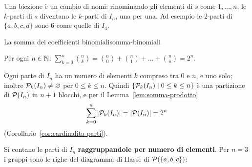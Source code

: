 \begin{spiegazione}
    Una biezione è un cambio di nomi: rinominando gli elementi di $s$ come $1, \dots, n$, le $k$-parti di $s$ diventano le $k$-parti di
    $I_n$, una per una. Ad esempio le $2$-parti di $\{a, b, c, d\}$ sono $6$ come quelle di $I_4$.
\end{spiegazione}

\begin{concetto}
\begin{Teorema}{La somma dei coefficienti binomiali}{somma-binomiali}
    \begin{prerequisiti}
    \end{prerequisiti}
    Per ogni $n \in \mathbb{N}$: \quad $\displaystyle\sum_{k = 0}^{n} \binom{n}{k} = \binom{n}{0} + \binom{n}{1} + \dots + \binom{n}{n} = 2^n$.
\end{Teorema}
\begin{dimostrazione}
    Ogni parte di $I_n$ ha un numero di elementi $k$ compreso tra $0$ e $n$, e uno solo; inoltre $\mathcal{P}_k(I_n) \neq \varnothing$ per $0 \leq k \leq n$.
    Quindi $\{\mathcal{P}_k(I_n) \mid 0 \leq k \leq n\}$ è una partizione di $\mathcal{P}(I_n)$ in $n + 1$ blocchi, e per il Lemma~\ref{lem:somma-prodotto}
    \[ \sum_{k = 0}^{n} |\mathcal{P}_k(I_n)| = |\mathcal{P}(I_n)| = 2^n \]
    (Corollario~\ref{cor:cardinalita-parti}).
\end{dimostrazione}
\end{concetto}

\begin{spiegazione}
    Si contano le parti di $I_n$ \textbf{raggruppandole per numero di elementi}. Per $n = 3$ i gruppi sono le righe del diagramma
    di Hasse di $\mathcal{P}(\{a, b, c\})$:
    \begin{center}
    \end{center}
\end{spiegazione}

